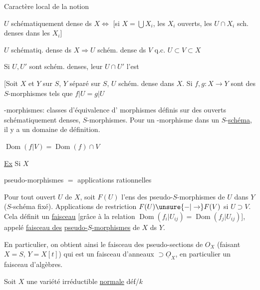 Caractère local de la notion

$U$ schématiquement dense ds $X\Longleftrightarrow$ [si $X=\bigcup X_i$, les $X_i$ ouverts, les $U\cap X_i$ sch. denses dans les $X_i$]

$U$ schématiq. dense ds $X\Longrightarrow U$ schém. dense ds  $V$ q.c. $U\subset V\subset X$

Si $U,U'$ sont schém. denses, leur $U\cap U'$ l'est

[Soit $X$ et $Y$ sur $S$,  $Y$ séparé sur $S$,  $U$ schém. dense dans $X$. Si $f,g:X\to Y$ sont des $S$-morphismes tels que $f|U=g|U$

-morphismes: classes d'équivalence d' morphismes définis sur des ouverts schématiquement denses,  $S$-morphismes. Pour un -morphisme dans un $S$-\uline{schéma}, il y a un domaine  de définition.

 $\operatorname{Dom}(f|V)=\operatorname{Dom}(f)\cap V$

\uline{Ex} Si $X$   

pseudo-morphismes $=$ applications rationnelles

Pour tout ouvert $U$ de $X$, soit $F(U)$ l'ens des pseudo-$S$-morphismes de $U$ dans $Y$ ($S$-schéma fixé). Applications de restriction $F(U)\unsure{-|\to}F(V)$ si $U\supset V$. Cela  définit un \uline{faisceau} [grâce à la relation $\operatorname{Dom}(f_i|U_{ij})=\operatorname{Dom}(f_j|U_{ij})$], appelé \uline{faisceau des}  \uline{pseudo-$S$-morphismes} de $X$ ds $Y$.

En particulier, on obtient ainsi le faisceau des pseudo-sections de $O_X$ (faisant $X=S$, $Y=X[t]$) qui est un faisceau d'anneaux $\supset\underline O_X$, en particulier un faisceau d'algèbres.


Soit $X$ une variété irréductible \uline{normale} déf/$k$

